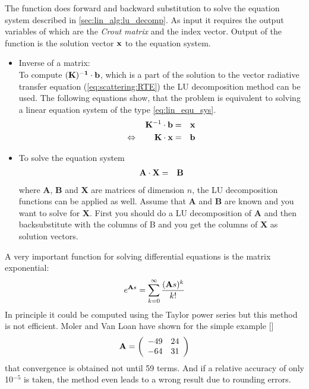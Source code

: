 The function  does forward and backward
substitution to solve the equation system described in
\ref{sec:lin_alg:lu_decomp}. As input it requires the output variables of
 which are the {\sl Crout matrix} and the index
vector. Output of the function is the solution vector ${\bf x}$ to the
equation system.


\label{lu_applications}

\begin{itemize}
\item Inverse of a matrix:\\
  To compute $(\bf K)^{-1}\cdot{\bf b}$, which is a part of the
solution to the vector radiative transfer equation (\ref{eq:scattering:RTE}) the LU
decomposition method can be used. The following equations show, that
the problem is equivalent to  solving a linear equation system of the type
\ref{eq:lin_equ_sys}.
\begin{eqnarray}
  {\bf K}^{-1}\cdot{\bf b} &=& {\bf x}\\
\Leftrightarrow \qquad  {\bf K}\cdot{\bf x} &=& {\bf b}
\end{eqnarray}

\item To solve the equation system
  \begin{eqnarray}
    {\bf A}\cdot{\bf X} &=& {\bf B}
  \end{eqnarray}
where {\bf A}, {\bf B} and  {\bf X} are matrices of dimension
$n$, the LU decomposition functions can be applied as well. Assume
that {\bf A} and {\bf B} are known and you want to solve for {\bf
 X}.
First you should do a LU decomposition of  {\bf A} and then
backsubstitute with the columns of B and you get the columns of {\bf
  X} as solution vectors.

\end{itemize}

\label{sec:lin_alg:mat_exp}

A very important function for solving differential equations is the
matrix exponential:
\begin{eqnarray}
  \label{eq:mat_exp}
  e^{{\bf A}s} = \sum_{k=0}^\infty{\frac{({\bf A} s)^k}{k!}}
\end{eqnarray}
In principle it could be computed using the Taylor power series but 
 this method is not efficient. {\sc Moler} and {\sc Van
  Loan} have shown for the simple example [\cite{Moler_Loan:79}]
\[ {\bf A} =
\left(
  \begin{array}{cc}
    -49 & 24\\
    -64 & 31
    \end{array} \right) \]
that convergence is obtained not until 59 terms. And if a relative
accuracy of only 10$^{-5}$ is taken, the method even leads to a wrong
result due to rounding errors.

